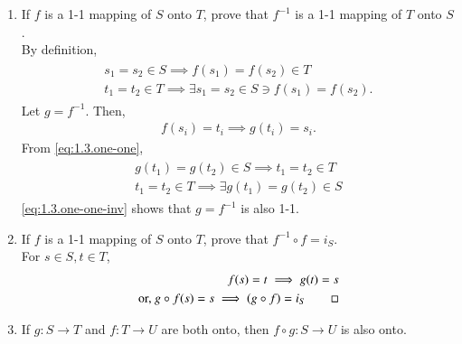 \begin{enumerate}[label=\arabic*.,ref=\thesubsection.\theenumi]
\begin{enumerate}
\end{enumerate}
\item If $f$ is a 1-1 mapping of $S$ onto $T$, prove that $f^{- 1}$ is a 1-1 mapping of $T$ onto $S$.
	\\
		\solution  By definition,  
		\begin{align}
			\label{eq:1.3.one-one}
			\begin{split}
	s_1 = s_2 \in S	\implies	f(s_1) = f(s_2) \in T
	\\
			t_1 = t_2 \in T \implies \exists s_1 = s_2 \in S \ni f(s_1) = f(s_2).
			\end{split}
		\end{align}
Let $g = f^{-1}$. Then, 
		\begin{align}
			f(s_i) = t_i \implies g(t_i) = s_i.
		\end{align}
		From 
			\eqref{eq:1.3.one-one}, 
		\begin{align}
			\label{eq:1.3.one-one-inv}
			\begin{split}
				g(t_1) = g(t_2) \in S	\implies	 t_1= t_2 \in T
	\\
			t_1 = t_2 \in T \implies \exists g(t_1) = g(t_2) \in S 
			\end{split}
		\end{align}
			\eqref{eq:1.3.one-one-inv} shows that $g = f^{-1}$ is also 1-1.
		\item 
			If $f$ is a 1-1 mapping of $S$ onto $T$, prove that $f^{- 1}\circ f = i_S$.
			\\
			\solution For $s \in S, t \in T$,
			\begin{align}
				f(s) = t \implies g(t) = s
				\\
				\text{or, }g\circ f(s) = s \implies \left(g\circ f\right) = i_S \qed
			\end{align}
		\item If $g: S \rightarrow T$ and $f: T\rightarrow  U$ are both onto, then $f\circ g: S \rightarrow   U$ is
also onto.
\\


\end{enumerate}

